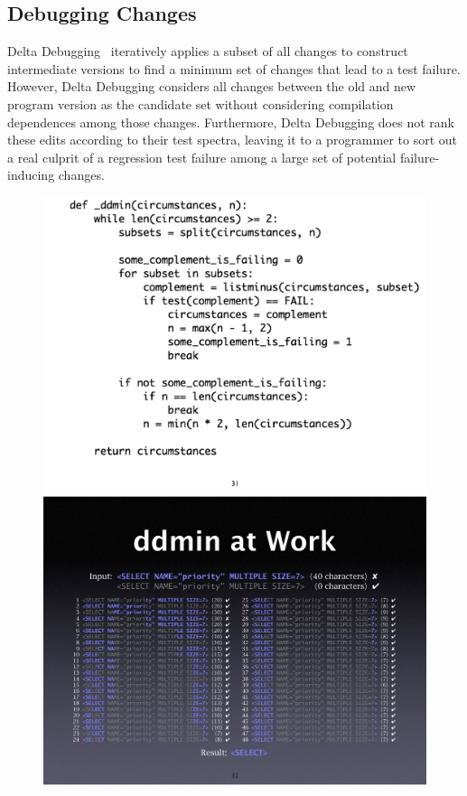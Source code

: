\subsection{Debugging Changes} 
\label{sec:deltadebugging} 
Delta Debugging~\cite{Zeller1999,zeller01} iteratively applies a subset of all changes to
construct intermediate versions to find a minimum set of changes that lead to
a test failure. However, Delta Debugging considers all changes between
the old and new program version as the candidate set without considering compilation dependences among those changes. Furthermore,
Delta Debugging does not rank these edits according to their test spectra, leaving it to a
programmer to sort out a real culprit of a regression test failure among a
large set of potential failure-inducing changes.

\begin{figure}
\centering
\begin{minipage}{.48\textwidth}
  \centering
\includegraphics[width=1\textwidth]{images/DeltaDebugging.pdf}
\end{minipage}
\begin{minipage}{.48\textwidth}
  \centering
\includegraphics[width=1\textwidth]{images/DeltaDebuggingIlustration.pdf}

\end{minipage}
\end{figure}
